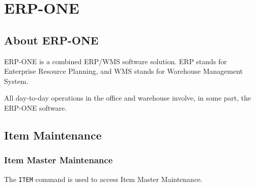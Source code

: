 \section{ERP-ONE}

\subsection{About ERP-ONE}

ERP-ONE is a combined ERP/WMS software solution. ERP stands for Enterprise Resource Planning, and WMS stands for Warehouse Management System.

All day-to-day operations in the office and warehouse involve, in some part, the ERP-ONE software.

\subsection{Item Maintenance}

\subsubsection{Item Master Maintenance}


The \texttt{ITEM} command is used to access Item Master Maintenance.

